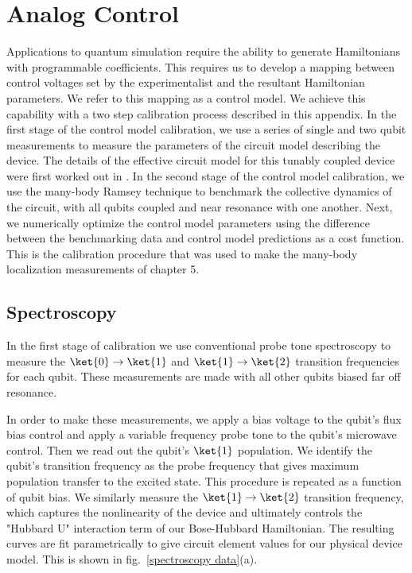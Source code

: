 \chapter[Analog Control]{Analog Control}

Applications to quantum simulation require the ability to generate Hamiltonians with programmable coefficients.
This requires us to develop a mapping between control voltages set by the experimentalist and the resultant Hamiltonian parameters.
We refer to this mapping as a control model.
We achieve this capability with a two step calibration process described in this appendix.
In the first stage of the control model calibration, we use a series of single and two qubit measurements to measure
the parameters of the circuit model describing the device.  The details of the effective circuit model for this tunably coupled device were first worked out in \cite{Neill2018}.
In the second stage of the control model calibration, we use the many-body Ramsey technique to benchmark the collective
dynamics of the circuit, with all qubits coupled and near resonance with one another.
Next, we numerically optimize the control model parameters using the difference between the benchmarking data and control model predictions as a cost function.
This is the calibration procedure that was used to make the many-body localization measurements of chapter 5.

\section{Spectroscopy \label{sec:spectroscopy}}

In the first stage of calibration we use conventional probe tone spectroscopy to measure
the $\ket{0} \rightarrow \ket{1}$ and $\ket{1} \rightarrow \ket{2}$ transition frequencies for each qubit.
These measurements are made with all other qubits biased far off resonance.

In order to make these measurements, we apply a bias voltage to the qubit's flux bias control
and apply a variable frequency probe tone to the qubit's microwave control.
Then we read out the qubit's $\ket{1}$ population.
We identify the qubit's transition frequency as the probe frequency that gives maximum population transfer to the excited state.
This procedure is repeated as a function of qubit bias.
We similarly measure the $\ket{1} \rightarrow \ket{2}$ transition frequency,
which captures the nonlinearity of the device and ultimately controls the "Hubbard U" interaction term of our Bose-Hubbard Hamiltonian.
The resulting curves are fit parametrically to give circuit element values for our physical device model.
This is shown in fig.~\ref{spectroscopy data}(a).

